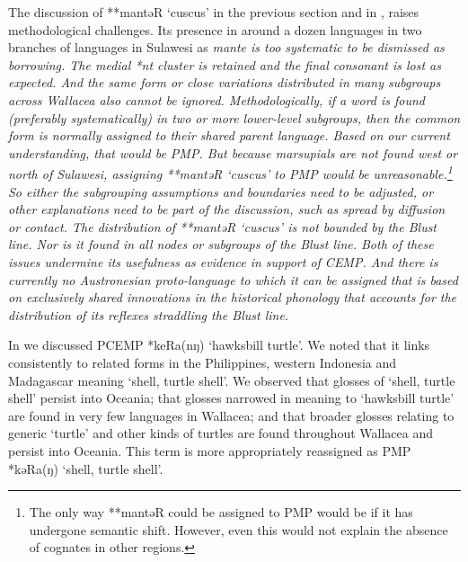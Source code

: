 The discussion of **mantəR ‘cuscus’ in the previous section
and in , raises methodological challenges.
Its presence in around a dozen languages in two branches of 
languages in Sulawesi as \it{mante} is too systematic to be dismissed as borrowing.
The medial *nt cluster is retained
and the final consonant is lost as expected.
And the same form or close variations distributed in many subgroups
across Wallacea also cannot be ignored.
Methodologically, if a word is found (preferably systematically)
in two or more lower-level subgroups,
then the common form is normally assigned to their shared parent language.
Based on our current understanding, that would be PMP.
But because marsupials are not found west or north of Sulawesi,
assigning **mantəR ‘cuscus’ to PMP would be unreasonable.\footnote{
		The only way **mantəR could be assigned to PMP would be if
		it has undergone semantic shift. However, even this
		would not explain the absence of cognates in other regions.}
So either the subgrouping assumptions
and boundaries need to be adjusted,
or other explanations need to be part of the discussion,
such as spread by diffusion or contact.
The distribution of **mantəR ‘cuscus’ is not bounded by the Blust line.
Nor is it found in all nodes or subgroups  of the Blust line.
Both of these issues undermine its usefulness as evidence in support of CEMP.
And there is currently no Austronesian proto-language to which
it can be assigned that is based on exclusively shared innovations
in the historical phonology that accounts for the distribution
of its reflexes straddling the Blust line.

In  we discussed PCEMP *keRa(nŋ) ‘hawksbill turtle’.
We noted that it links consistently to related forms in the Philippines,
western Indonesia and Madagascar meaning ‘shell, turtle shell’.
We observed that glosses of ‘shell,
turtle shell’ persist into Oceania; that glosses narrowed in
meaning to ‘hawksbill turtle’ are found in very few languages
in Wallacea; and that broader glosses relating to generic ‘turtle’
and other kinds of turtles are found throughout Wallacea
and persist into Oceania.
This term is more appropriately reassigned as PMP *kəRa(ŋ) ‘shell, turtle shell’.